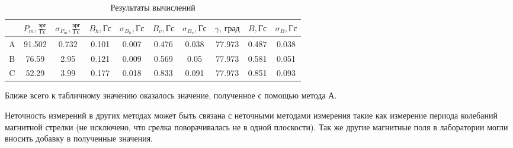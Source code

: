\documentclass[a4paper,12pt]{article} %
\begin{document}
\begin{table}[h]
\centering
    \begin{tabular}{|c|c|c|c|c|c|c|c|c|c|}
        \hline
        \text{ } & $P_m, \frac{\text{эрг}}{\text{Гс}}$ & $\sigma_{P_m}, \frac{\text{эрг}}{\text{Гс}}$ & $B_h, \text{Гс}$ & $\sigma_{B_h}, \text{Гс}$ & $B_v, \text{Гс}$ & $\sigma_{B_v}, \text{Гс}$ & $\gamma \text{, град}$ & $B, \text{Гс}$ & $\sigma_B, \text{Гс}$ \\ \hline
            A & 91.502 & 0.732 & 0.101 & 0.007 & 0.476 & 0.038 & 77.973 & 0.487 & 0.038 \\ \hline
            B & 76.59 & 2.95 & 0.121 & 0.009 & 0.569 & 0.05 & 77.973 & 0.581 & 0.051 \\ \hline
            C & 52.29 & 3.99 & 0.177 & 0.018 & 0.833 & 0.091 & 77.973 & 0.851 & 0.093 \\ \hline
    \end{tabular}
    \label{tab7}
    \caption{Результаты вычислений}
\end{table}

Ближе всего к табличному значению оказалось значение, полученное с помощью метода А.

Неточность измерений в других методах может быть связана с неточными методами измерения такие как измерение периода колебаний магнитной стрелки (не исключено, что срелка поворачивалась не в одной плоскости). Так же другие магнитные поля в лаборатории могли вносить добавку в полученные значения.
\end{document}
